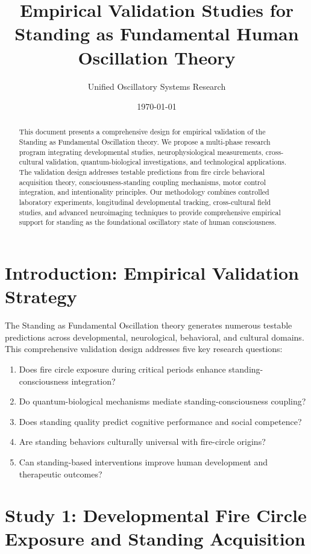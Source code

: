 \documentclass[12pt]{article}
\title{Empirical Validation Studies for Standing as Fundamental Human Oscillation Theory}
\author{Unified Oscillatory Systems Research}
\date{\today}
\begin{document}
\maketitle

\begin{abstract}
This document presents a comprehensive design for empirical validation of the Standing as Fundamental Oscillation theory. We propose a multi-phase research program integrating developmental studies, neurophysiological measurements, cross-cultural validation, quantum-biological investigations, and technological applications. The validation design addresses testable predictions from fire circle behavioral acquisition theory, consciousness-standing coupling mechanisms, motor control integration, and intentionality principles. Our methodology combines controlled laboratory experiments, longitudinal developmental tracking, cross-cultural field studies, and advanced neuroimaging techniques to provide comprehensive empirical support for standing as the foundational oscillatory state of human consciousness.
\end{abstract}

\section{Introduction: Empirical Validation Strategy}

The Standing as Fundamental Oscillation theory generates numerous testable predictions across developmental, neurological, behavioral, and cultural domains. This comprehensive validation design addresses five key research questions:

\begin{enumerate}
\item Does fire circle exposure during critical periods enhance standing-consciousness integration?
\item Do quantum-biological mechanisms mediate standing-consciousness coupling?
\item Does standing quality predict cognitive performance and social competence?
\item Are standing behaviors culturally universal with fire-circle origins?
\item Can standing-based interventions improve human development and therapeutic outcomes?
\end{enumerate}

\section{Study 1: Developmental Fire Circle Exposure and Standing Acquisition}
\end{document}
